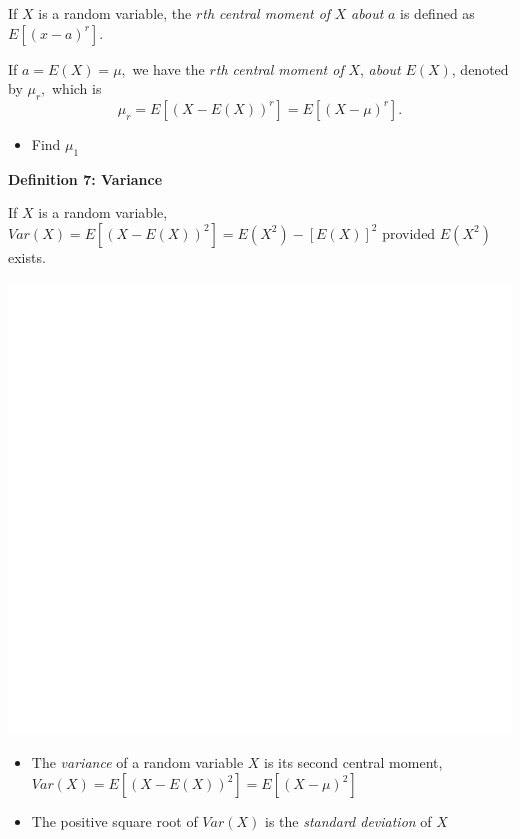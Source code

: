 \documentclass[]{book}
\providecommand{\tightlist}{%
  \setlength{\itemsep}{0pt}\setlength{\parskip}{0pt}}
\begin{document}
If \(X\) is a random variable, the \(r\)\emph{th central moment of} \(X\) \emph{about} \(a\) is defined as \(E[(x-a)^r]\).

If \(a= E(X) = \mu,\) we have the \(r\)\emph{th central moment of} \(X\), \emph{about} \(E(X)\), denoted by \(\mu_r,\) which is
\[\mu_r=E[(X-E(X))^r] = E[(X-\mu)^r] .\]

\begin{itemize}
\tightlist
\item
  Find \(\mu_1\)
\end{itemize}

\newpage

\textbf{Definition 7: Variance}

If \(X\) is a random variable, \(Var(X)= E[(X-E(X))^2]= E(X^2) - [E(X)]^2\) provided \(E(X^2)\) exists.

\begin{center}\includegraphics[width=1\linewidth]{figure/Ch1box16-1} \end{center}

\begin{itemize}
\item
  The \emph{variance} of a random variable \(X\) is its second central moment, \(Var(X) = E[(X-E(X))^2]= E[(X-\mu)^2]\)
\item
  The positive square root of \(Var(X)\) is the \emph{standard deviation} of \(X\)
\end{itemize}
\end{document}
